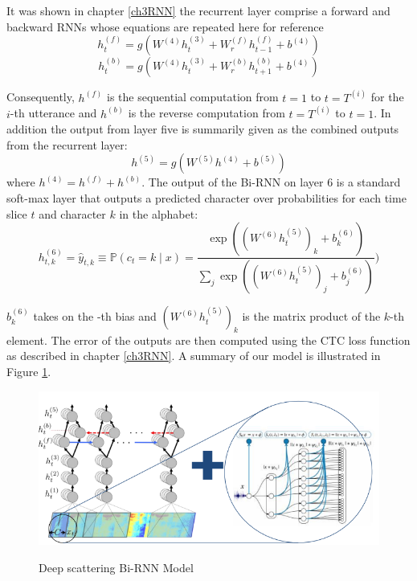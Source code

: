 {It was shown in chapter \ref{ch3RNN} the recurrent layer comprise a forward and backward RNNs whose equations are repeated here for reference
\begin{equation}
    h^{(f)}_t = g(W^{(4)} h^{(3)}_t + W^{(f)}_r h^{(f)}_{t−1} + b^{(4)})
    \label{ch06_02_fwd}
\end{equation}
\begin{equation}
h^{(b)}_t = g(W^{(4)} h^{(3)}_t + W^{(b)}_r h^{(b)}_{t+1} + b^{(4)})    \label{ch06_03_bwd}
\end{equation}

Consequently, $h^{(f)}$ is the sequential computation from $t=1$ to $t=T^{(i)}$ for the $i$-th utterance and $h^{(b)}$ is the reverse computation from $t=T^{(i)}$ to $t=1$.  In addition the output from layer five is summarily given as the combined outputs from the recurrent layer:
\begin{equation}
h^{(5)} = g(W^{(5)} h^{(4)} + b^{(5)})    \label{ch06_04_l5}
\end{equation}
where $h^{(4)} = h^{(f)} + h^{(b)}$. The output of the Bi-RNN on layer 6 is a standard soft-max layer that outputs a predicted character over probabilities for each time slice $t$ and character $k$ in the alphabet:
\begin{equation}
h^{(6)}_{t,k} = \hat{y}_{t,k} \equiv \mathbb{P}(c_t = k \mid x) = \frac{\exp{ \left( (W^{(6)} h^{(5)}_t)_k + b^{(6)}_k \right)}}{\sum_j \exp{\left( (W^{(6)} h^{(5)}_t)_j + b^{(6)}_j \right)}})    \label{ch06_05_l6}
\end{equation}

$b^{(6)}_k$ takes on the -th bias and $(W^{(6)} h^{(5)}_t)_k$ is the matrix product of the $k$-th element.  The error of the outputs are then computed using the CTC loss function \cite{graves_2014} as described in chapter \ref{ch3RNN}.  A summary of our model is illustrated in Figure \ref{fig_6_1_ctc_scatter}.
\begin{figure}
\centering
  \includegraphics[width=14cm]{thesis/images/ctc_scatter.png}\\
  \caption{Deep scattering Bi-RNN Model} \label{fig_6_1_ctc_scatter}
\end{figure}

}
